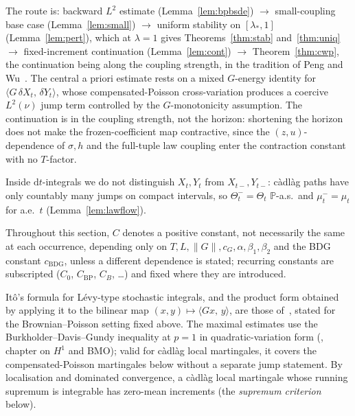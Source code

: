 \documentclass[preprint,12pt]{elsarticle}
\newcommand{\Prob}{\mathbb{P}}
\newcommand{\diff}{\mathrm{d}}
\newcommand{\inner}[2]{\langle #1,\,#2\rangle}
\newcommand{\Lnu}{L^2(\nu)}
\numberwithin{equation}{section}
\theoremstyle{plain}
\theoremstyle{definition}
\theoremstyle{\PaperRemarkStyle}
\begin{document}
The route is: backward $L^2$ estimate
(Lemma~\ref{lem:bpbsde}) $\to$ small-coupling base case (Lemma~\ref{lem:small}) $\to$
uniform stability on $[\lambda_*,1]$ (Lemma~\ref{lem:pert}), which at $\lambda=1$ gives
Theorems~\ref{thm:stab} and~\ref{thm:uniq} $\to$ fixed-increment continuation
(Lemma~\ref{lem:cont}) $\to$ Theorem~\ref{thm:cwp}, the continuation being along the
coupling strength, in the tradition of Peng and Wu~\cite{PengWu}. The central a priori
estimate rests on a mixed $G$-energy identity for $\inner{G\,\delta X_t}{\delta Y_t}$,
whose compensated-Poisson cross-variation produces a coercive $\Lnu$ jump term controlled
by the $G$-monotonicity assumption. The continuation is in the coupling strength, not the
horizon: shortening the horizon does not make the frozen-coefficient map contractive,
since the $(z,u)$-dependence of $\sigma,h$ and the full-tuple law coupling enter the
contraction constant with no $T$-factor.

Inside $\diff t$-integrals we do not distinguish $X_t,Y_t$ from $X_{t-},Y_{t-}$:
c\`adl\`ag paths have only countably many jumps on compact intervals, so
$\Theta_t^-=\Theta_t$ $\Prob$-a.s.\ and $\mu_t^-=\mu_t$ for a.e.\ $t$
(Lemma~\ref{lem:lawflow}).

Throughout this section, $C$ denotes a positive constant, not necessarily the same at each
occurrence, depending only on $T,L,\|G\|,c_G,\alpha,\beta_1,\beta_2$ and the BDG constant
$c_{\mathrm{BDG}}$, unless a different dependence is stated; recurring constants are
subscripted ($C_0$, $C_{\mathrm{BP}}$, $C_B$, \dots) and fixed where they are introduced.

It\^o's formula for L\'evy-type stochastic integrals, and the product form obtained by
applying it to the bilinear map $(x,y)\mapsto\inner{Gx}{y}$, are those
of~\cite[\S4.4]{Applebaum}, stated for the Brownian--Poisson setting fixed above. The
maximal estimates use the Burkholder--Davis--Gundy inequality at $p=1$ in
quadratic-variation form (\cite{HeWangYan}, chapter on $H^1$ and BMO); valid for
c\`adl\`ag local martingales, it covers the compensated-Poisson martingales below without
a separate jump statement. By localisation and dominated convergence, a c\`adl\`ag local
martingale whose running supremum is integrable has zero-mean increments (the
\emph{supremum criterion} below).
\end{document}
